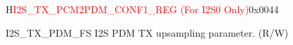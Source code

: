 \begin{register}{H}{\textcolor{red}{I2S\_TX\_PCM2PDM\_CONF1\_REG (For I2S0 Only)}}{0x{}0044}\label{regdesc:I2STXPCM2PDMCONF1REG}
%
%
%
\regnewline%
\begin{regdesc}\begin{reglist}
\label{fielddesc:I2STXPDMFS}\item [I2S\_TX\_PDM\_FS] I2S PDM TX upsampling parameter.  (R/W)
\end{reglist}\end{regdesc}
\end{register}


